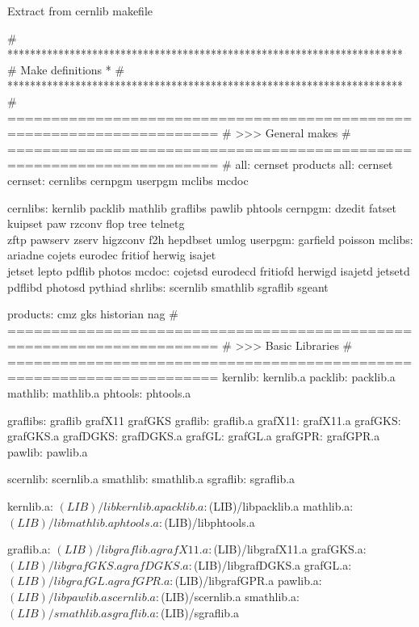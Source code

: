 \begin{XMPt}{Extract from cernlib makefile}

# **********************************************************************
# Make definitions                                                     *
# **********************************************************************
# ======================================================================
# >>> General makes
# ======================================================================
# all:        cernset products
  all:        cernset
  cernset:    cernlibs cernpgm userpgm mclibs mcdoc
 
  cernlibs:   kernlib packlib mathlib graflibs pawlib phtools
  cernpgm:    dzedit fatset kuipset paw rzconv flop tree telnetg    \\
              zftp pawserv zserv higzconv f2h hepdbset umlog
  userpgm:    garfield poisson
  mclibs:     ariadne cojets eurodec fritiof herwig isajet        \\
              jetset lepto pdflib photos
  mcdoc:      cojetsd eurodecd fritiofd herwigd isajetd jetsetd   \\
              pdflibd photosd pythiad
  shrlibs:    scernlib smathlib sgraflib sgeant
 
  products:   cmz gks historian nag
# ======================================================================
# >>> Basic Libraries
# ======================================================================
  kernlib:    kernlib.a
  packlib:    packlib.a
  mathlib:    mathlib.a
  phtools:    phtools.a

  graflibs:   graflib grafX11 grafGKS
  graflib:    graflib.a
  grafX11:    grafX11.a
  grafGKS:    grafGKS.a
  grafDGKS:   grafDGKS.a
  grafGL:     grafGL.a
  grafGPR:    grafGPR.a
  pawlib:     pawlib.a

  scernlib:   scernlib.a
  smathlib:   smathlib.a
  sgraflib:   sgraflib.a

  kernlib.a:  $(LIB)/libkernlib.a
  packlib.a:  $(LIB)/libpacklib.a
  mathlib.a:  $(LIB)/libmathlib.a
  phtools.a:  $(LIB)/libphtools.a

  graflib.a:  $(LIB)/libgraflib.a
  grafX11.a:  $(LIB)/libgrafX11.a
  grafGKS.a:  $(LIB)/libgrafGKS.a
  grafDGKS.a: $(LIB)/libgrafDGKS.a
  grafGL.a:   $(LIB)/libgrafGL.a
  grafGPR.a:  $(LIB)/libgrafGPR.a
  pawlib.a:   $(LIB)/libpawlib.a

  scernlib.a: $(LIB)/scernlib.a
  smathlib.a: $(LIB)/smathlib.a
  sgraflib.a: $(LIB)/sgraflib.a

\end{XMPt}

